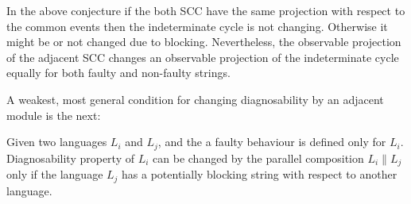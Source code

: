 \documentclass[a4paper, 10pt, conference]{ieeeconf} \IEEEoverridecommandlockouts
\begin{document}
In the above conjecture if the both SCC have the same projection with respect to
the common events then the indeterminate cycle is not changing. Otherwise it
might be or not changed due to blocking. Nevertheless, the observable
projection of the adjacent SCC changes an observable projection of
the indeterminate cycle equally for both faulty and non-faulty strings.

A weakest, most general condition for changing diagnosability by an
adjacent module is the next:

\begin{conjecture} Given two
languages $L_i$ and $L_j$, and the a faulty behaviour is defined only for $L_i$.
Diagnosability property of $L_i$ can be changed by the parallel composition $L_i
\parallel L_j$ only if the language $L_j$ has a potentially blocking string with
respect to another language.
\end{conjecture}






\end{document}

